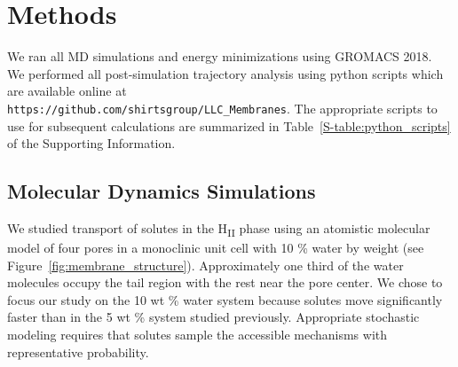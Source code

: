 \documentclass{article}
\begin{document}
%  

  \section{Methods}
    
  We ran all MD simulations and energy minimizations using GROMACS 2018. 
  ~\cite{bekker_gromacs:_1993,berendsen_gromacs:_1995,van_der_spoel_gromacs:_2005,hess_gromacs_2008}
  We performed all post-simulation trajectory analysis using python scripts which 
  are available online at \\ \texttt{https://github.com/shirtsgroup/LLC\_Membranes}.
  The appropriate scripts to use for subsequent calculations are summarized in 
  Table~\ref{S-table:python_scripts} of the Supporting Information.
  
  \subsection{Molecular Dynamics Simulations}

  We studied transport of solutes in the H\textsubscript{II} phase using an atomistic
  molecular model of four pores in a monoclinic unit cell with 10 \% water by weight 
  (see Figure~\ref{fig:membrane_structure}). Approximately one third of the water 
  molecules occupy the tail region with the rest near the pore center. We chose to
  focus our study on the 10 wt \% water system because solutes move significantly 
  faster than in the 5 wt \% system studied previously. Appropriate stochastic 
  modeling requires that solutes sample the accessible mechanisms with representative
  probability.
  
\end{document}
